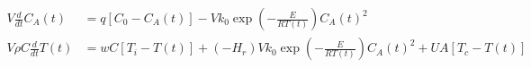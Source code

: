 \begin{equation}
  \begin{aligned}
    V \frac{d}{dt}C_A(t)      & = q [C_0 - C_A(t)] - V k_0 \exp(-\frac{E}{RT(t)}) C_A(t)^2
    \\
    V \rho C \frac{d}{dt}T(t) & = w C [T_i - T(t)] + (- H_r) V k_0 \exp(-\frac{E}{RT(t)}) C_A(t)^2 + U A [T_c - T(t)]
  \end{aligned}
  \label{eq:CSTR_2ndorder01_3}
\end{equation}